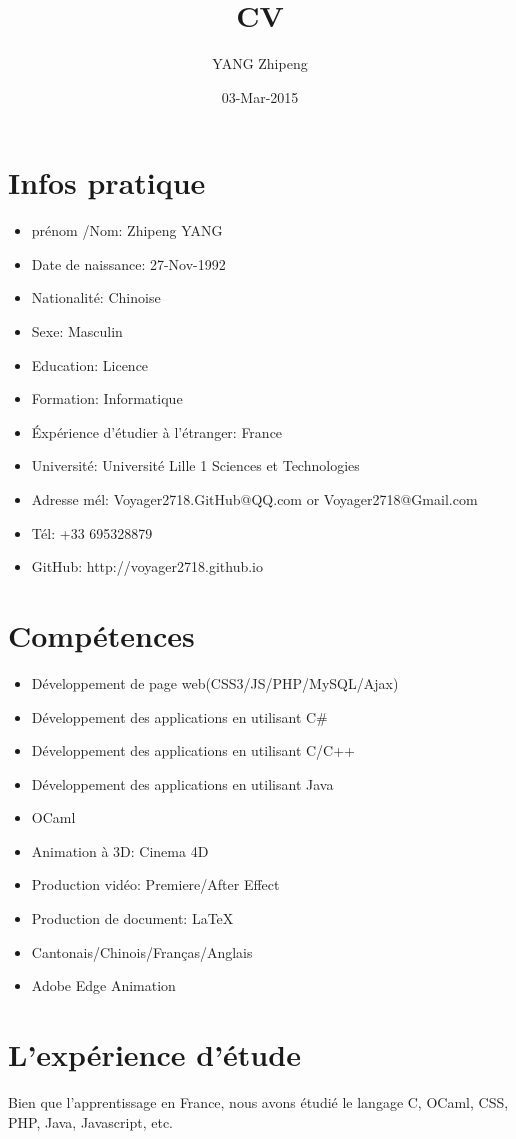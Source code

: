 \documentclass[UTF8]{ctexart}
\title{CV}
\author{YANG Zhipeng}
\date{03-Mar-2015}
\begin{document}
\maketitle
\pagestyle{fancy}
\section{Infos pratique}
\begin{itemize}
\item pr\'enom /Nom: Zhipeng YANG
\item Date de naissance: 27-Nov-1992
\item Nationalit\'e: Chinoise
\item Sexe: Masculin
\item Education: Licence
\item Formation: Informatique
\item \'Exp\'erience d'\'etudier \`a l'\'etranger: France
\item Universit\'e: Universit\'e Lille 1 Sciences et Technologies
\item Adresse m\'el: Voyager2718.GitHub@QQ.com or Voyager2718@Gmail.com
\item T\'el: +33 695328879
\item GitHub: http://voyager2718.github.io
\end{itemize}
\section{Comp\'etences}
\begin{itemize}
\item D\'eveloppement de page web(CSS3/JS/PHP/MySQL/Ajax)
\item D\'eveloppement des applications en utilisant C\#{}
\item D\'eveloppement des applications en utilisant C/C++
\item D\'eveloppement des applications en utilisant Java
\item OCaml
\item Animation \`a 3D: Cinema 4D
\item Production vid\'eo: Premiere/After Effect
\item Production de document: \LaTeX
\item Cantonais/Chinois/Fran\c{c}as/Anglais
\item Adobe Edge Animation
\end{itemize}
\section{L'exp\'erience d'\'etude}
Bien que l'apprentissage en France, nous avons \'etudi\'e le langage C, OCaml, CSS, PHP, Java, Javascript, etc.
\end{document}
